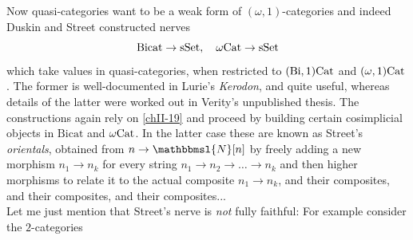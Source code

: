         Now quasi-categories want to be a weak form of $(\omega,1)$-categories and indeed Duskin and Street constructed nerves
        \begin{equation*}
            \mathrm{Bicat} \to \operatorname{sSet}, \quad \mathrm{\omega Cat} \to \operatorname{sSet}
        \end{equation*}
        which take values in quasi-categories, when restricted to $\mathrm{(\mathrm{Bi}, 1)Cat}$ and $\mathrm{(\omega, 1)Cat}$. The former is well-documented in Lurie's \emph{Kerodon}, and quite useful, whereas details of the latter were worked out in Verity's unpublished thesis. The constructions again rely on \ref{chII-19} and proceed by building certain cosimplicial objects in $\mathrm{Bicat}$ and $\mathrm{\omega Cat}$. In the latter case these are known as Street's \emph{orientals}, obtained from $n \to \mathbbmsl{N}[n]$ by freely adding a new morphism $n_1 \to n_k$ for every string $n_1 \to n_2 \to \ldots \to n_k$ and then higher morphisms to relate it to the actual composite $n_1 \to n_k$, and their composites, and their composites, and their composites...\\
        Let me just mention that Street's nerve is \emph{not} fully faithful: For example consider the $2$-categories
